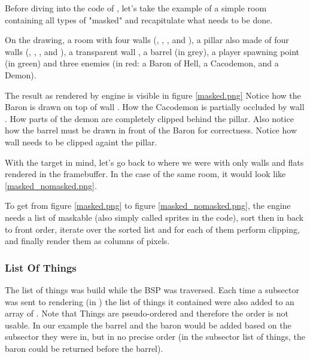 Before diving into the code of , let's take the example of a simple room containing all types of "masked" and recapitulate what needs to be done.\\
\par
 On the drawing, a room with four walls (, , , and ), a pillar also made of four walls (, , , and ), a transparent wall , a barrel (in grey), a player spawning point (in green) and three enemies (in red: a Baron of Hell, a Cacodemon, and a Demon).\\
\par
The result as rendered by \doom{} engine is visible in figure \ref{masked.png} Notice how the Baron is drawn on top of wall . How the Cacodemon is partially occluded by wall . How parts of the demon are completely clipped behind the pillar. Also notice how the barrel must be drawn in front of the Baron for correctness. Notice how wall  needs to be clipped againt the pillar.\\
\par
{}
\par
With the target in mind, let's go back to where we were with only walls and flats rendered in the framebuffer. In the case of the same room, it would look like \ref{masked_nomasked.png}.\\
\par
{}
\par
To get from figure \ref{masked.png} to figure \ref{masked_nomasked.png}, the engine needs a list of maskable (also simply called sprites in the code), sort then in back to front order, iterate over the sorted list and for each of them perform clipping, and finally render them as columns of pixels.\\
\par
\subsubsection{List Of Things}
 The list of things was build while the BSP was traversed. Each time a subsector was sent to rendering (in ) the list of things it contained were also added to an array of . Note that Things are pseudo-ordered and therefore the order is not usable. In our example the barrel and the baron would be added based on the subsector they were in, but in no precise order (in the subsector list of things, the baron could be returned before the barrel).\\
 \par
